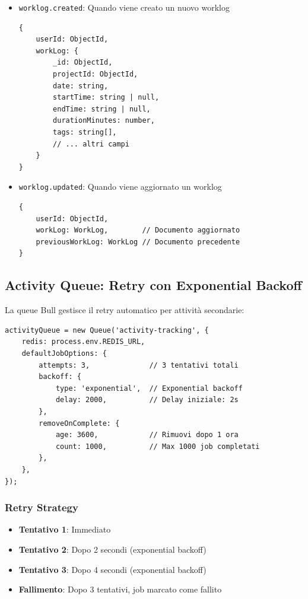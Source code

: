 \documentclass[11pt,a4paper]{article}
\begin{document}
\begin{itemize}
    \item \texttt{worklog.created}: Quando viene creato un nuovo worklog
    \begin{lstlisting}[caption=Payload worklog.created]
{
    userId: ObjectId,
    workLog: {
        _id: ObjectId,
        projectId: ObjectId,
        date: string,
        startTime: string | null,
        endTime: string | null,
        durationMinutes: number,
        tags: string[],
        // ... altri campi
    }
}
    \end{lstlisting}
    
    \item \texttt{worklog.updated}: Quando viene aggiornato un worklog
    \begin{lstlisting}[caption=Payload worklog.updated]
{
    userId: ObjectId,
    workLog: WorkLog,        // Documento aggiornato
    previousWorkLog: WorkLog // Documento precedente
}
    \end{lstlisting}
\end{itemize}

\subsection{Activity Queue: Retry con Exponential Backoff}

La queue Bull gestisce il retry automatico per attività secondarie:

\begin{lstlisting}[caption=Configurazione Activity Queue]
activityQueue = new Queue('activity-tracking', {
    redis: process.env.REDIS_URL,
    defaultJobOptions: {
        attempts: 3,              // 3 tentativi totali
        backoff: {
            type: 'exponential',  // Exponential backoff
            delay: 2000,          // Delay iniziale: 2s
        },
        removeOnComplete: {
            age: 3600,            // Rimuovi dopo 1 ora
            count: 1000,          // Max 1000 job completati
        },
    },
});
\end{lstlisting}

\subsubsection{Retry Strategy}

\begin{itemize}
    \item \textbf{Tentativo 1}: Immediato
    \item \textbf{Tentativo 2}: Dopo 2 secondi (exponential backoff)
    \item \textbf{Tentativo 3}: Dopo 4 secondi (exponential backoff)
    \item \textbf{Fallimento}: Dopo 3 tentativi, job marcato come fallito
\end{itemize}
\end{document}

